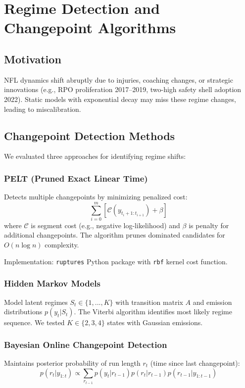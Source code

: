 \section{Regime Detection and Changepoint Algorithms}

\subsection{Motivation}
NFL dynamics shift abruptly due to injuries, coaching changes, or strategic innovations (e.g., RPO proliferation 2017--2019, two-high safety shell adoption 2022). Static models with exponential decay may miss these regime changes, leading to miscalibration.

\subsection{Changepoint Detection Methods}
We evaluated three approaches for identifying regime shifts:

\subsubsection{PELT (Pruned Exact Linear Time)}
Detects multiple changepoints by minimizing penalized cost:
\begin{equation}
\sum_{i=0}^{m} \left[\mathcal{C}(y_{t_i+1:t_{i+1}}) + \beta\right]
\end{equation}
where $\mathcal{C}$ is segment cost (e.g., negative log-likelihood) and $\beta$ is penalty for additional changepoints. The algorithm prunes dominated candidates for $O(n \log n)$ complexity.

Implementation: \texttt{ruptures} Python package with \texttt{rbf} kernel cost function.

\subsubsection{Hidden Markov Models}
Model latent regimes $S_t \in \{1, ..., K\}$ with transition matrix $A$ and emission distributions $p(y_t|S_t)$. The Viterbi algorithm identifies most likely regime sequence. We tested $K \in \{2, 3, 4\}$ states with Gaussian emissions.

\subsubsection{Bayesian Online Changepoint Detection}
Maintains posterior probability of run length $r_t$ (time since last changepoint):
\begin{equation}
p(r_t | y_{1:t}) \propto \sum_{r_{t-1}} p(y_t | r_{t-1}) p(r_t | r_{t-1}) p(r_{t-1} | y_{1:t-1})
\end{equation}

